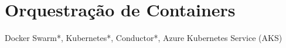 


\section{Orquestração de Containers}

Docker Swarm*, Kubernetes*, Conductor*, Azure Kubernetes Service (AKS)







